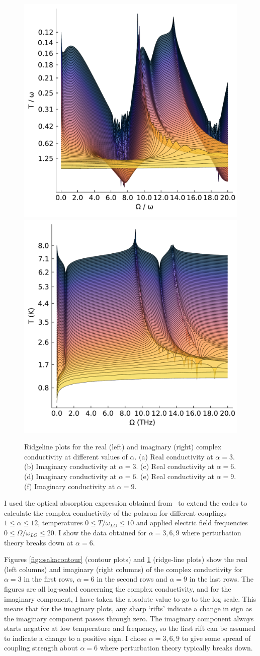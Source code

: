 \begin{figure}[p]
    \includegraphics[width=.49\textwidth]{figures/conductivity_plot_temp_real_9.pdf}
    \includegraphics[width=.49\textwidth]{figures/conductivity_plot_temp_imag_9.pdf}

    \caption{Ridgeline plots for the real (left) and imaginary (right) complex conductivity at different values of $\alpha$. (a) Real conductivity at $\alpha = 3$. (b) Imaginary conductivity at $\alpha = 3$. (c) Real conductivity at $\alpha = 6$. (d) Imaginary conductivity at $\alpha = 6$. (e) Real conductivity at $\alpha = 9$. (f) Imaginary conductivity at $\alpha = 9$.}
    \label{fig:osakaridge}
\end{figure}

I used the optical absorption expression obtained from~\cite{devreese_optical_1972} to extend the codes to calculate the complex conductivity of the polaron for different couplings $1 \leq \alpha \leq 12$, temperatures $0 \leq T / \omega_{LO} \leq 10$ and applied electric field frequencies $0 \leq \Omega / \omega_{LO} \leq 20$. I show the data obtained for $\alpha = 3, 6, 9$ where perturbation theory breaks down at $\alpha = 6$. 

Figures \ref{fig:osakacontour} (contour plots) and \ref{fig:osakaridge} (ridge-line plots) show the real (left columns) and imaginary (right columns) of the complex conductivity for $\alpha = 3$ in the first rows, $\alpha = 6$ in the second rows and $\alpha = 9$ in the last rows. The figures are all log-scaled concerning the complex conductivity, and for the imaginary component, I have taken the absolute value to go to the log scale. This means that for the imaginary plots, any sharp `rifts' indicate a change in sign as the imaginary component passes through zero. The imaginary component always starts negative at low temperature and frequency, so the first rift can be assumed to indicate a change to a positive sign. I chose $\alpha = 3, 6, 9$ to give some spread of coupling strength about $\alpha = 6$ where perturbation theory typically breaks down. 

